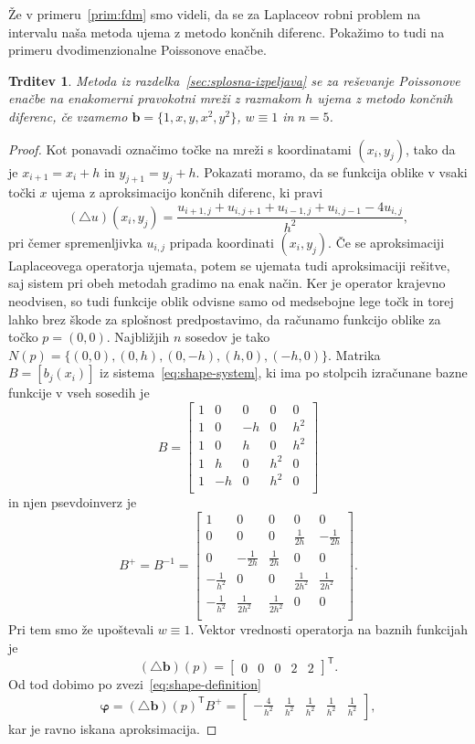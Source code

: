 \documentclass[12pt,a4paper,twoside]{article}
\theoremstyle{definition} %
\theoremstyle{plain} %
\newtheorem{trditev}[definicija]{Trditev}
\numberwithin{equation}{section}
\newcommand{\T}{\mathsf{T}}
\newcommand{\lap}{\triangle}
\renewcommand{\b}{\boldsymbol}
\renewcommand{\phi}{\varphi}
\begin{document}
Že v primeru~\ref{prim:fdm} smo videli, da se za Laplaceov robni problem na
intervalu naša metoda ujema z metodo končnih diferenc. Pokažimo to tudi na
primeru dvodimenzionalne Poissonove enačbe.

\begin{trditev}
  \label{trd:eq-to-fdm}
  Metoda iz razdelka~\ref{sec:splosna-izpeljava} se za reševanje Poissonove
  enačbe na enakomerni pravokotni mreži z razmakom $h$ ujema z metodo končnih
  diferenc, če vzamemo $\b{b} = \{1, x, y, x^2, y^2\}$, $w \equiv 1$ in
  $n=5$.
\end{trditev}
\begin{proof}
Kot ponavadi označimo točke na mreži s koordinatami $(x_i, y_j)$, tako da je
$x_{i+1} = x_i + h$ in $y_{j+1} = y_j + h$.
Pokazati moramo, da se funkcija oblike v vsaki točki $x$ ujema z aproksimacijo
končnih diferenc,
ki pravi
\[
  (\lap u)(x_i, y_j) = \frac{u_{i+1,j} + u_{i, j+1} + u_{i-1,j} + u_{i, j-1} -
  4u_{i,j}}{h^2},
\]
pri čemer spremenljivka $u_{i, j}$ pripada koordinati $(x_i, y_j)$. Če se
aproksimaciji Laplaceovega operatorja ujemata, potem se ujemata tudi
aproksimaciji rešitve, saj sistem pri obeh metodah gradimo na enak način.
Ker je operator krajevno neodvisen, so tudi funkcije oblik odvisne samo od
medsebojne lege točk in torej lahko brez škode
za splošnost predpostavimo, da računamo funkcijo oblike za točko
$p = (0, 0)$. Najbližjih $n$ sosedov je tako $N(p) = \{(0, 0), (0, h), (0, -h),
(h, 0), (-h, 0)\}$. Matrika $B = [b_j(x_i)]$ iz sistema~\eqref{eq:shape-system},
ki ima po stolpcih izračunane bazne funkcije v vseh sosedih je
\[
  B =
  \begin{bmatrix}
    1 & 0 & 0 & 0 & 0 \\
    1 & 0 & -h & 0 & h^2 \\
    1 & 0 & h & 0 & h^2 \\
    1 & h & 0 & h^2 & 0 \\
    1 & -h & 0 & h^2 & 0 \\
  \end{bmatrix}
\]
in njen psevdoinverz je
\[
  B^+ = B^{-1} =
  \begin{bmatrix}
     1 & 0 & 0 & 0 & 0 \\
 0 & 0 & 0 & \frac{1}{2 h} & -\frac{1}{2 h} \\
 0 & -\frac{1}{2 h} & \frac{1}{2 h} & 0 & 0 \\
 -\frac{1}{h^2} & 0 & 0 & \frac{1}{2 h^2} & \frac{1}{2 h^2} \\
 -\frac{1}{h^2} & \frac{1}{2 h^2} & \frac{1}{2 h^2} & 0 & 0 \\
  \end{bmatrix}.
\]
Pri tem smo že upoštevali $w \equiv 1$.
Vektor vrednosti operatorja na baznih funkcijah je
\[
  (\lap \b{b})(p) =
\begin{bmatrix}
  0 & 0 & 0 & 2 & 2
\end{bmatrix}^\T.
\]
Od tod dobimo po zvezi~\eqref{eq:shape-definition}
\[
  \b\phi = (\lap \b b)(p)^\T B^{+} =
  \begin{bmatrix}
    -\frac{4}{h^2} & \frac{1}{h^2} & \frac{1}{h^2} & \frac{1}{h^2} &
    \frac{1}{h^2}
  \end{bmatrix},
\]
kar je ravno iskana aproksimacija.
\end{proof}
\end{document}
